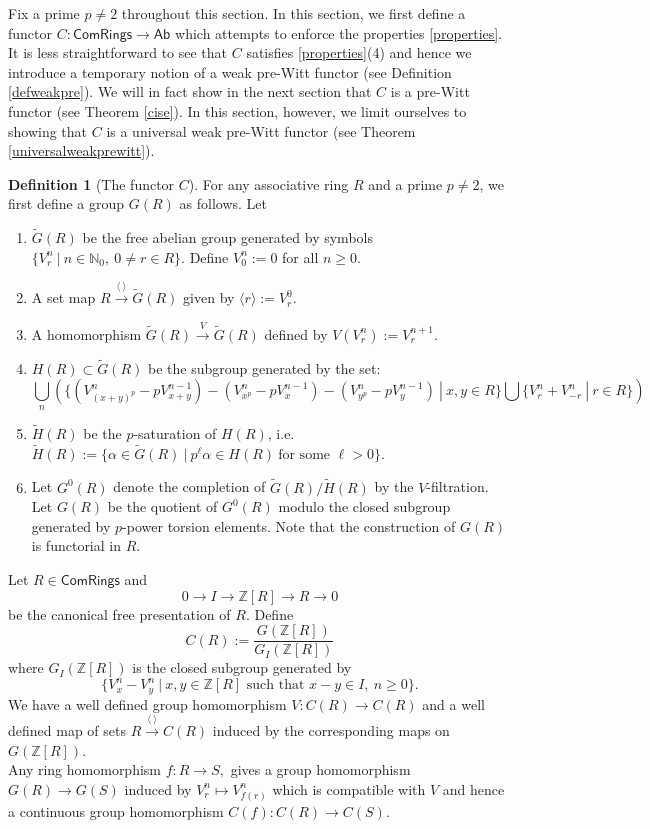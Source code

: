 \documentclass[10pt]{amsart}
\theoremstyle{plain}
\theoremstyle{definition}
\newtheorem{definition}[thm]{Definition}
\newcommand{\Union}{\bigcup}
\renewcommand{\tilde}{\widetilde}
\newcommand{\N}{{\mathbb N}}
\newcommand{\Z}{{\mathbb Z}}
\newcommand{\ab}[1]{\langle {#1} \rangle}
\newcommand{\Com}{{\mathsf{ComRings}}}
\begin{document}
\noindent Fix a prime $p \neq 2$ throughout this section. In this section, we first define a functor $C : \Com \to \mathsf{Ab}$ which attempts to enforce the properties \ref{properties}. It is less straightforward to see that $C$ satisfies \ref{properties}(4) and hence we introduce a temporary notion of a weak pre-Witt functor (see Definition \ref{defweakpre}). We will in fact show in the next section that $C$ is a pre-Witt functor (see Theorem \ref{cise}). In this section, however, we limit ourselves to showing that $C$ is a universal weak pre-Witt functor (see Theorem \ref{universalweakprewitt}).
\begin{definition}[The functor $C$]\label{functorc}
For any associative ring $R$ and a prime $p\neq 2$, we first define a group $G(R)$ as follows. Let 
\begin{enumerate}
\item $\tilde{G}(R)$ be the free abelian group generated by symbols $\{ V^n_r \ | \ n\in \N_0 , \ 0\neq r\in R\}$. Define $V^n_0:=0$ for all $n\geq0$. 
\item A set map $R \xrightarrow{\ab{\ } } \tilde{G}(R)$ given by $\ab{r} := V^0_r$.
\item A homomorphism $\tilde{G}(R) \xrightarrow{V} \tilde{G}(R)$ defined by $V(V^n_r):= V^{n+1}_r$.
\item $H(R)\subset \tilde{G}(R)$ be the subgroup generated by the set: 
$$  \Union_n\left(\{(V^n_{(x+y)^p} - p V^{n-1}_{x+y}) - (V^n_{x^p} - p V^{n-1}_{x}) - (V^n_{y^p} - p V^{n-1}_{y})\ | \ x, y \in R \} \Union \{V^n_r+V^n_{-r} \ | \ r \in R\}\right)$$ 
\item $\tilde{H}(R)$ be the $p$-saturation of $H(R)$, i.e.
$ \tilde{H}(R):= \{ \alpha \in \tilde{G}(R) \ | \ p^\ell \alpha \in H(R) \ \text{for some } \ell >0\}$.
\item Let $G^0(R)$ denote the completion of $\tilde{G}(R)/\tilde{H}(R)$ by the $V$-filtration. Let $G(R)$ be the quotient of $G^0(R)$ modulo the closed subgroup generated by $p$-power torsion elements. Note that the construction of $G(R)$ is functorial in $R$.\\
\end{enumerate}
Let $R\in \Com$ and 
$$ 0 \to I \to \Z[R] \to R\to 0$$
be the canonical free presentation of $R$.
Define $$C(R):=\frac{G(\Z[R])}{G_I(\Z[R])}$$ where $G_I(\Z[R])$ is the closed subgroup generated by 
$$\{V_x^n - V_y^n \ | \ x, y \in \Z[R] \text{ such that } x-y \in I, \ n \geq 0 \}.$$
We have a well defined group homomorphism $V: C(R) \to C(R)$ and a well defined map of sets $R \xrightarrow{\ab{ \ }} C(R)$ induced by the corresponding maps on $G(\Z[R])$.\\

\noindent Any ring homomorphism $f: R \to S,$ gives a group homomorphism $G(R) \to G(S)$ induced by $V^n_r \mapsto V^n_{f(r)}$ which is compatible with $V$ and hence a continuous group homomorphism $C(f): C(R) \to C(S).$ 
\end{definition}
\end{document}
